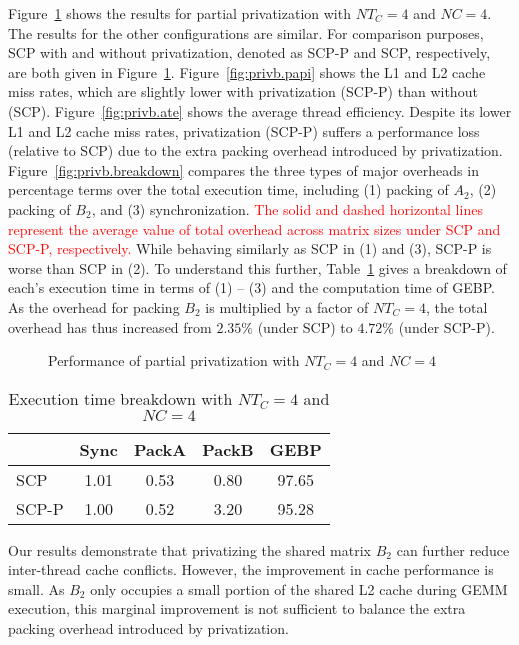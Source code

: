 Figure~\ref{fig:privb} shows the results for partial
privatization with $NT_C=4$ and $NC=4$.
The results for the other 
configurations are similar.
For comparison purposes,
SCP with and without privatization,
denoted as SCP-P and SCP, respectively,
are both given in Figure~\ref{fig:privb}.
Figure~\ref{fig:privb.papi} shows the L1 and L2
cache miss rates, which are 
slightly lower with privatization (SCP-P) than without
(SCP). Figure~\ref{fig:privb.ate} shows the average thread efficiency.
Despite its lower L1 and L2 cache miss rates,
privatization (SCP-P) suffers a performance loss
(relative to SCP) due to 
the extra packing overhead introduced by privatization.
Figure~\ref{fig:privb.breakdown} compares the
three types of major overheads in percentage terms 
over the total execution time, including
(1) packing of $A_2$, (2) packing of $B_2$,
and (3) synchronization.
\textcolor{red}{
The solid and dashed horizontal lines represent
the average value of total overhead across matrix sizes
under SCP and SCP-P, respectively.}
While behaving similarly as SCP
in (1) and (3), SCP-P is worse than SCP in (2).
To understand this further,
Table~\ref{tab:breakdown} gives a breakdown of each's
execution time in terms of (1) -- (3) and the
computation time of GEBP. As
the overhead for packing $B_2$
is multiplied by a factor of $NT_C=4$,
the total overhead has thus increased
from $2.35\%$ (under SCP) to $4.72\%$ (under SCP-P).

\begin{figure}
  \centering
  \caption{Performance of partial privatization with $NT_C=4$ and $NC=4$}
  \label{fig:privb}
\end{figure}

\begin{table}
  \centering
  \caption{Execution time breakdown with $NT_C=4$ and $NC=4$}
  \label{tab:breakdown}
  \setlength{\tabcolsep}{3.5pt}
  \begin{tabular}{lcccc}
    \toprule
     & Sync & PackA & PackB & GEBP\\
    \midrule
    SCP   & 1.01 & 0.53 & 0.80 & 97.65 \\
    SCP-P & 1.00 & 0.52 & 3.20 & 95.28\\
    \bottomrule
  \end{tabular}
\end{table}


Our results demonstrate that privatizing the shared matrix $B_2$ can further
reduce inter-thread cache conflicts.
However, the improvement in cache performance is small.
As $B_2$ only occupies a small portion of the shared L2 cache during GEMM execution,
this marginal improvement is not sufficient to
balance the extra packing overhead introduced
by privatization.
